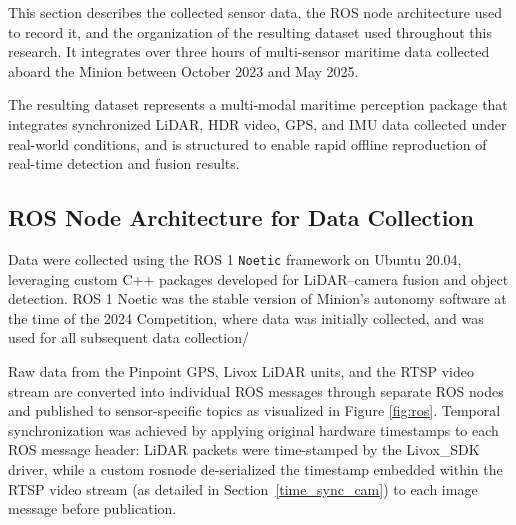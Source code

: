 \documentclass[../main.tex]{subfiles}
\begin{document}


This section describes the collected sensor data, the ROS node architecture used to record it, 
and the organization of the resulting dataset used throughout this research.  
It integrates over three hours of multi-sensor maritime data collected aboard the Minion between October 2023 and May 2025.

The resulting dataset represents a multi-modal maritime perception package that integrates synchronized LiDAR, HDR video, GPS, and IMU data collected under real-world conditions, and is structured to enable rapid offline reproduction of real-time detection and fusion results.


\subsection{ROS Node Architecture for Data Collection}
\label{sec:ros_architecture}

Data were collected using the ROS 1 \texttt{Noetic} framework on Ubuntu 20.04, 
leveraging custom C++ packages developed for LiDAR–camera fusion and object detection.  
ROS 1 Noetic was the stable version of Minion's autonomy software at the time of the 2024 Competition, where data was initially collected, and was used for all subsequent data collection/%

Raw data from the Pinpoint GPS, Livox LiDAR units, and the RTSP video stream are converted into individual ROS messages through separate ROS nodes and published to sensor-specific topics as visualized in Figure \ref{fig:ros}.  
Temporal synchronization was achieved by applying  original hardware timestamps to each ROS message header: LiDAR packets were time-stamped by the Livox\_SDK driver, while a custom rosnode de-serialized the timestamp embedded within the \ac{RTSP} video stream (as detailed in Section~\ref{time_sync_cam}) to each image message before publication.
\end{document}

